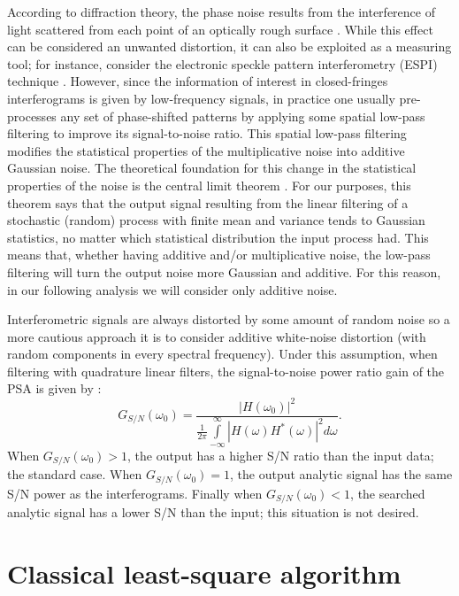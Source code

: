 According to diffraction theory, the phase noise results from the
interference of light scattered from each point of an optically rough surface 
\cite{Gasvik:2002}. While this effect can be considered an unwanted distortion, 
it can also be exploited as a measuring tool; for instance, consider the 
electronic speckle pattern interferometry (ESPI) technique \cite{Gasvik:2002}.
However, since the information of interest in closed-fringes interferograms is 
given by low-frequency signals, in
practice one usually pre-processes any set of phase-shifted patterns by applying
some spatial low-pass filtering to improve its signal-to-noise ratio. This spatial
low-pass filtering modifies the statistical properties of the multiplicative noise
into additive Gaussian noise. The theoretical foundation for this change in the
statistical properties of the noise is the central limit theorem 
\cite{Papoulis:2002}. For our
purposes, this theorem says that the output signal resulting from the linear
filtering of a stochastic (random) process with finite mean and variance tends
to Gaussian statistics, no matter which statistical distribution the input process
had. This means that, whether having additive and/or multiplicative noise, the
low-pass filtering will turn the output noise more Gaussian and additive. For
this reason, in our following analysis we will consider only additive noise.

Interferometric signals are always distorted by some amount of random
noise so a more cautious approach it is to consider additive white-noise 
distortion (with random components in every spectral frequency). Under this 
assumption, when filtering with quadrature linear filters, the signal-to-noise 
power ratio gain of the PSA is given by \cite{Servin:09}:
\begin{equation}
 G_{S/N}(\omega_0)=\frac{|H(\omega_0)|^2}{\frac{1}{2\pi}\int\limits_{-\infty}
^{\infty} |H(\omega)H^*(\omega)|^2 d\omega}.
\end{equation}
When $G_{S/N}(\omega_0)>1$, the output has a higher S/N ratio than the input data;
the standard case. When $G_{S/N}(\omega_0)=1$, the output analytic signal has 
the same S/N power as the interferograms. Finally when $G_{S/N}(\omega_0)<1$, the 
searched analytic signal has a lower S/N than the input; this situation is not 
desired.

\section{Classical least-square algorithm}

